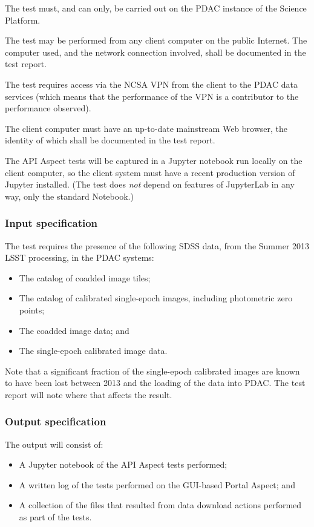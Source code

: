 The test must, and can only, be carried out on the PDAC instance of the Science Platform.

The test may be performed from any client computer on the public Internet.
The computer used, and the network connection involved, shall be documented in the test report.

The test requires access via the NCSA VPN from the client to the PDAC data services 
(which means that the performance of the VPN is a contributor to the performance observed).

The client computer must have an up-to-date mainstream Web browser, the identity of which shall be documented in the test report.

The API Aspect tests will be captured in a Jupyter notebook run locally on the client computer, so the client system must have a recent production version of Jupyter installed.
(The test does \emph{not} depend on features of JupyterLab in any way, only the standard Notebook.)


\subsubsection{Input specification}

The test requires the presence of the following SDSS data, from the Summer 2013 LSST processing, in the PDAC systems:

\begin{itemize}

  \item{The catalog of coadded image tiles;}
  \item{The catalog of calibrated single-epoch images, including photometric zero points;}
  \item{The coadded image data; and}
  \item{The single-epoch calibrated image data.}
\end{itemize}

Note that a significant fraction of the single-epoch calibrated images are known to have been lost between 2013 and the loading of the data into PDAC.
The test report will note where that affects the result.

\subsubsection{Output specification}

The output will consist of:

\begin{itemize}
  \item{A Jupyter notebook of the API Aspect tests performed;}
  \item{A written log of the tests performed on the GUI-based Portal Aspect; and}
  \item{A collection of the files that resulted from data download actions performed as part of the tests.}
\end{itemize}


